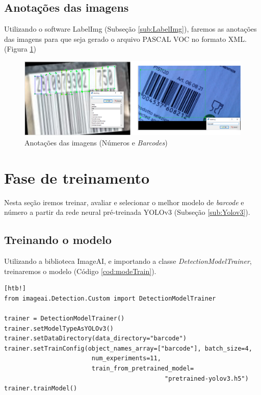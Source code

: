 \subsection{Anotações das imagens}

Utilizando o software LabelImg (Subseção \ref{sub:LabelImg}), faremos as anotações das imagens para que seja gerado o arquivo PASCAL VOC no formato XML. (Figura \ref{fig:barNumAn})

\begin{figure}[htbp]
	\centering
	\includegraphics[width=1\linewidth]{figuras/MachineLearning/barNumAn.png}
	\caption{Anotações das imagens (Números e \textit{Barcodes})}
	\label{fig:barNumAn}
\end{figure}

\section{Fase de treinamento}

Nesta seção iremos treinar, avaliar e selecionar o melhor modelo de \textit{barcode} e número a partir da rede neural pré-treinada YOLOv3 (Subseção \ref{sub:Yolov3}).

\subsection{Treinando o modelo}

Utilizando a biblioteca ImageAI, e importando a classe \textit{DetectionModelTrainer}, treinaremos o modelo (Código \ref{cod:modeTrain}).

\begin{lstlisting}[caption=Exemplo de código do método \textit{data augmentation}, label=cod:modeTrain][htb!]
from imageai.Detection.Custom import DetectionModelTrainer

trainer = DetectionModelTrainer()
trainer.setModelTypeAsYOLOv3()
trainer.setDataDirectory(data_directory="barcode")
trainer.setTrainConfig(object_names_array=["barcode"], batch_size=4, 
                        num_experiments=11, 
                        train_from_pretrained_model=
                                            "pretrained-yolov3.h5")
trainer.trainModel()
\end{lstlisting}

